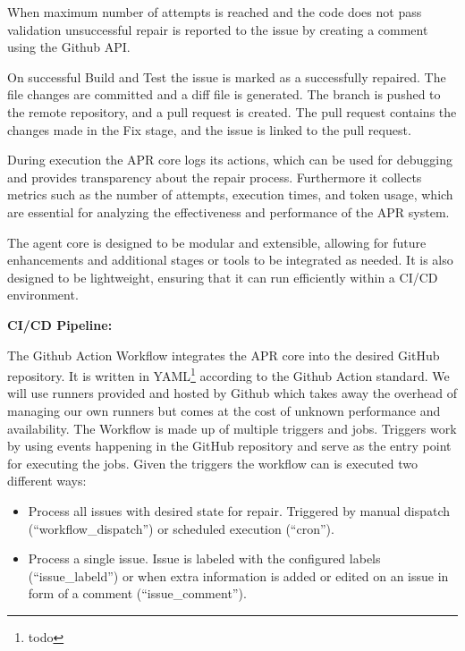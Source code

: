 When maximum number of attempts is reached and the code does not pass validation  unsuccessful repair is reported to the issue by creating a comment using the Github API.

On successful Build and Test the issue is marked as a successfully repaired. The file changes are committed and a diff file is generated. The branch is pushed to the remote repository, and a pull request is created. The pull request contains the changes made in the Fix stage, and the issue is linked to the pull request.

During execution the APR core logs its actions, which can be used for debugging and provides transparency about the repair process. Furthermore it collects metrics such as the number of attempts, execution times, and token usage, which are essential for analyzing the effectiveness and performance of the APR system.

The agent core is designed to be modular and extensible, allowing for future enhancements and additional stages or tools to be integrated as needed. It is also designed to be lightweight, ensuring that it can run efficiently within a CI/CD environment.



\textbf{CI/CD Pipeline:}

The Github Action Workflow integrates the APR core into the desired GitHub repository. It is written in YAML\footnote{todo} according to the Github Action standard. %
We will use runners provided and hosted by Github which takes away the overhead of managing our own runners but comes at the cost of unknown performance and availability. %
The Workflow is made up of multiple triggers and jobs. Triggers work by using events happening in the GitHub repository and serve as the entry point for executing the jobs. Given the triggers the workflow can is executed two different ways:

\begin{itemize}
    \item Process all issues with desired state for repair. Triggered by manual dispatch (``workflow\_dispatch'') or scheduled execution (``cron'').
    \item Process a single issue. Issue is labeled with the configured labels (``issue\_labeld'') or when extra information is added or edited on an issue in form of a comment (``issue\_comment'').
\end{itemize}

